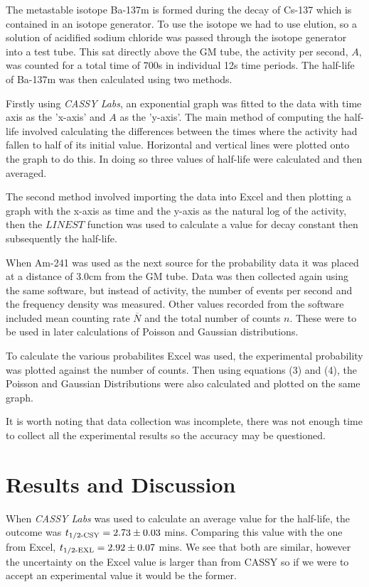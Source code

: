\documentclass[twocolumn]{revtex4}
\begin{document}
The metastable isotope Ba-137m is formed during the decay of Cs-137 which is contained in an isotope generator. To use the isotope we had to use elution, so a solution of acidified sodium chloride was passed through the isotope generator into a test tube. This sat directly above the GM tube, the activity per second, $A$, was counted for a total time of 700s in individual 12s time periods. The half-life of Ba-137m was then calculated using two methods.

Firstly using \textit{CASSY Labs}, an exponential graph was fitted to the data with time axis as the 'x-axis' and $A$ as the 'y-axis'. The main method of computing the half-life involved calculating the differences between the times where the activity had fallen to half of its initial value. Horizontal and vertical lines were plotted onto the graph to do this. In doing so three values of half-life were calculated and then averaged.

The second method involved importing the data into Excel and then plotting a graph with the x-axis as time and the y-axis as the natural log of the activity, then the $LINEST$ function was used to calculate a value for decay constant then subsequently the half-life. 

When Am-241 was used as the next source for the probability data it was placed at a distance of 3.0cm from the GM tube. Data was then collected again using the same software, but instead of activity, the number of events per second and the frequency density was measured. Other values recorded from the software included mean counting rate $\overline{N}$ and the total number of counts $n$. These were to be used in later calculations of Poisson and Gaussian distributions. 

To calculate the various probabilites Excel was used, the experimental probability was plotted against the number of counts. Then using equations (3) and (4), the Poisson and Gaussian Distributions were also calculated and plotted on the same graph. 

It is worth noting that data collection was incomplete, there was not enough time to collect all the experimental results so the accuracy may be questioned. 

\vspace{-3ex}
\section{Results and Discussion}
\vspace{-2ex}
When \textit{CASSY Labs} was used to calculate an average value for the half-life, the outcome was $t\textsubscript{1/2-CSY}=2.73\pm0.03$ mins. Comparing this value with the one from Excel, $t\textsubscript{1/2-EXL}=2.92\pm0.07$ mins. We see that both are similar, however the uncertainty on the Excel value is larger than from CASSY so if we were to accept an experimental value it would be the former. 
\end{document}
